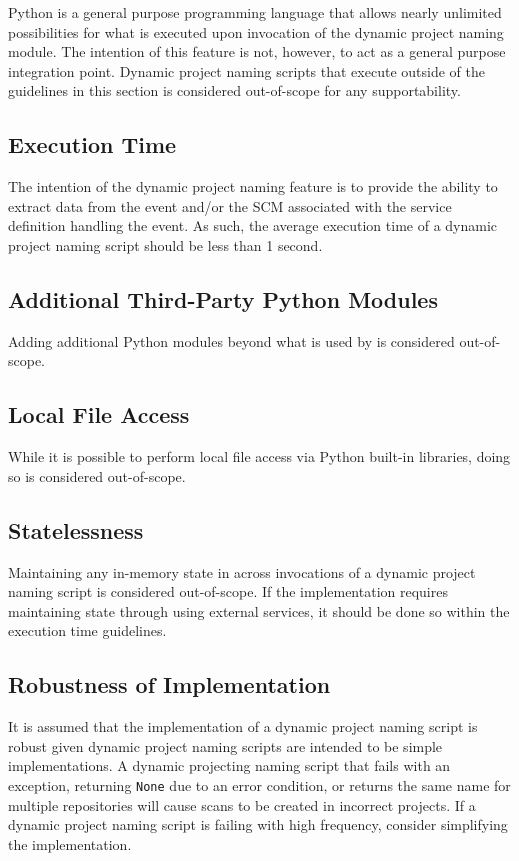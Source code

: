 Python is a general purpose programming language that allows nearly unlimited possibilities for what is
executed upon invocation of the dynamic project naming module.  The intention of this feature is not, however,
to act as a general purpose integration point.  Dynamic project naming scripts that execute outside of the
guidelines in this section is considered out-of-scope for any supportability.

\subsection{Execution Time}

The intention of the dynamic project naming feature is to provide the ability to extract data from the
event and/or the SCM associated with the service definition handling the event.  As such, the
average execution time of a dynamic project naming script should be less than 1 second.

\subsection{Additional Third-Party Python Modules}

Adding additional Python modules beyond what is used by \cxoneflow is considered out-of-scope.

\subsection{Local File Access}

While it is possible to perform local file access via Python built-in libraries, doing so
is considered out-of-scope.

\subsection{Statelessness}

Maintaining any in-memory state in across invocations of a dynamic project naming script is considered out-of-scope.
If the implementation requires maintaining state through using external services, it should be done so within the
execution time guidelines.

\subsection{Robustness of Implementation}

It is assumed that the implementation of a dynamic project naming script is robust given dynamic project naming scripts
are intended to be simple implementations.  A dynamic projecting naming script that fails with an exception, returning \texttt{None} due to an error
condition, or returns the same name for multiple repositories will cause scans to be created in incorrect projects.  If
a dynamic project naming script is failing with high frequency, consider simplifying the implementation.

